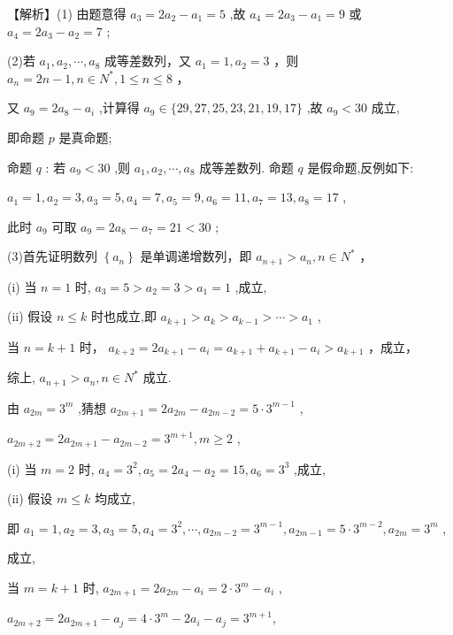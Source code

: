 \documentclass[10pt]{article}
\newcommand*\circled[1]{\tikz[baseline=(char.base)]{\node[shape=circle,draw,inner sep=1.5pt] (char) {\small #1};}}
\begin{document}
【解析】(1) 由题意得 \({a}_{3} = 2{a}_{2} - {a}_{1} = 5\) ,故 \({a}_{4} = 2{a}_{3} - {a}_{1} = 9\) 或 \({a}_{4} = 2{a}_{3} - {a}_{2} = 7\) ;

(2)若 \({a}_{1},{a}_{2},\cdots ,{a}_{8}\) 成等差数列，又 \({a}_{1} = 1,{a}_{2} = 3\) ，则 \({a}_{n} = {{2n} - 1},n \in  {N}^{ * },1 \leq  n \leq  8\) ，

又 \({a}_{9} = 2{a}_{8} - {a}_{i}\) ,计算得 \({a}_{9} \in  \{ {29},{27},{25},{23},{21},{19},{17}\}\) ,故 \({a}_{9} < {30}\) 成立,

即命题 \(p\) 是真命题;

命题 \(q\) : 若 \({a}_{9} < {30}\) ,则 \({a}_{1},{a}_{2},\cdots ,{a}_{8}\) 成等差数列. 命题 \(q\) 是假命题,反例如下:

\({a}_{1} = 1,{a}_{2} = 3,{a}_{3} = 5,{a}_{4} = 7,{a}_{5} = 9,{a}_{6} = {11},{a}_{7} = {13},{a}_{8} = {17}\) ,

此时 \({a}_{9}\) 可取 \({a}_{9} = 2{a}_{8} - {a}_{7} = {21} < {30}\) ;

(3)首先证明数列 \(\left\{  {a}_{n}\right\}\) 是单调递增数列，即 \({a}_{n + 1} > {a}_{n},n \in  {N}^{ * }\) ，

(i) 当 \(n = 1\) 时, \({a}_{3} = 5 > {a}_{2} = 3 > {a}_{1} = 1\) ,成立,

(ii) 假设 \(n \leq  k\) 时也成立,即 \({a}_{k + 1} > {a}_{k} > {a}_{k - 1} > \cdots  > {a}_{1}\) ,

当 \(n = k + 1\) 时， \({a}_{k + 2} = 2{a}_{k + 1} - {a}_{i} = {a}_{k + 1} + {a}_{k + 1} - {a}_{i} > {a}_{k + 1}\) ，成立，

综上, \({a}_{n + 1} > {a}_{n},n \in  {N}^{ * }\) 成立.

由 \({a}_{2m} = {3}^{m}\) ,猜想 \({a}_{{2m} + 1} = 2{a}_{2m} - {a}_{{2m} - 2} = 5 \cdot  {3}^{m - 1}\)  \circled{1} ,

\({a}_{{2m} + 2} = 2{a}_{{2m} + 1} - {a}_{{2m} - 2} = {3}^{m + 1},m \geq  2\)  \circled{2} ,

(i) 当 \(m = 2\) 时, \({a}_{4} = {3}^{2},{a}_{5} = 2{a}_{4} - {a}_{2} = {15},{a}_{6} = {3}^{3}\) ,成立,

(ii) 假设 \(m \leq  k\) 均成立,

即 \({a}_{1} = 1,{a}_{2} = 3,{a}_{3} = 5,{a}_{4} = {3}^{2},\cdots ,{a}_{{2m} - 2} = {3}^{m - 1},{a}_{{2m} - 1} = 5 \cdot  {3}^{m - 2},{a}_{2m} = {3}^{m}\) ,

成立,

当 \(m = k + 1\) 时, \({a}_{{2m} + 1} = 2{a}_{2m} - {a}_{i} = 2 \cdot  {3}^{m} - {a}_{i}\) ,

\({a}_{{2m} + 2} = 2{a}_{{2m} + 1} - {a}_{j} = 4 \cdot  {3}^{m} - 2{a}_{i} - {a}_{j} = {3}^{m + 1},\)
\end{document}
